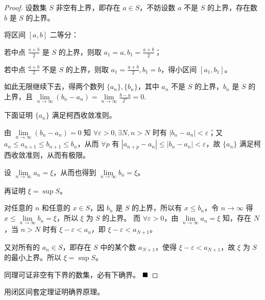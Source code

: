 \begin{proof}
    设数集 $S$ 非空有上界，即存在 $a \in S$，不妨设数 $a$ 不是 $S$ 的上界，存在数 $b$ 是 $S$ 的上界。
    
    将区间 $[a, b]$ 二等分：
    
    若中点 $\frac{a+b}{2}$ 是 $S$ 的上界，则取 $a_1 = a, b_1 = \frac{a+b}{2}$；
    
    若中点 $\frac{a+b}{2}$ 不是 $S$ 的上界，则取 $a_1 = \frac{a+b}{2}, b_1 = b$，得小区间 $[a_1, b_1]$。
    
    如此无限继续下去，得两个数列 $\{a_n\}, \{b_n\}$，其中 $a_n$ 不是 $S$ 的上界，$b_n$ 是 $S$ 的上界，且
    $
    \lim\limits_{n \to \infty} (b_n - a_n) = \lim\limits_{n \to \infty} \frac{b-a}{2^n} = 0.
    $
    
    下面证明 $\{a_n\}$ 满足柯西收敛准则。

    由 $\lim\limits_{n \to \infty} (b_n - a_n) = 0$ 知 $\forall \varepsilon > 0, \exists N, n > N$ 时有 $|b_n - a_n| < \varepsilon$；又 $a_n \leq a_{n+1} \leq b_{n+1} \leq b_n$，从而 $\forall p$ 有 $|a_{n+p} - a_n| \leq |b_n - a_n| < \varepsilon$，故 $\{a_n\}$ 满足柯西收敛准则，从而有极限。
    
    设 $\lim\limits_{n \to \infty} a_n = \xi$，从而也得到 $\lim\limits_{n \to \infty} b_n = \xi$。
    
    再证明 $\xi = \sup S$。
    
    对任意的 $n$ 和任意的 $x \in S$，因 $b_n$ 是 $S$ 的上界，所以有 $x \leq b_n$，令 $n \to \infty$ 得 $x \leq \lim\limits_{n \to \infty} b_n = \xi$，所以 $\xi$ 为 $S$ 的上界。
    而 $\forall \varepsilon > 0$，由 $\lim\limits_{n \to \infty} a_n = \xi$ 知，存在 $N$，当 $n > N$ 时有 $\xi - \varepsilon < a_n$，即 $\xi - \varepsilon < a_{N+1}$。
    
    又对所有的 $a_n \in S$，即存在 $S$ 中的某个数 $a_{N+1}$，使得 $\xi - \varepsilon < a_{N+1}$，故 $\xi$ 为 $S$ 的最小上界。所以 $\xi = \sup S$。
    
    同理可证非空有下界的数集，必有下确界。
    $\hfill\blacksquare$
\end{proof}    

\begin{problem}
    用闭区间套定理证明确界原理。
\end{problem}

